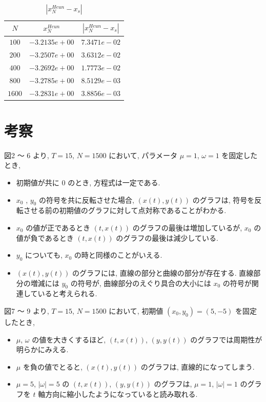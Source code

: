 \documentclass[11pt]{jsarticle}
\begin{document}
\begin{table}[htbp]
\centering
\begin{tabular}{|c||c|c|} \hline
\textbf{$N$} & \textbf{$x^{Heun}_{N}$} & \textbf{$|x^{Heun}_{N}-x_{s}|$} \\ \hline
$100$ & $-3.2135e+00$ & $7.3471e-02$ \\ \hline
$200$ & $-3.2507e+00$ & $3.6312e-02$ \\ \hline
$400$ & $-3.2692e+00$ & $1.7773e-02$ \\ \hline
$800$ & $-3.2785e+00$ & $8.5129e-03$ \\ \hline
$1600$ & $-3.2831e+00$ & $3.8856e-03$ \\ \hline
\end{tabular}
\caption{$|x^{Heun}_{N}-x_{s}|$}
\end{table}



\clearpage
\section{考察}
図2 〜 6 より, $T = 15$, $N = 1500$ において, パラメータ $\mu = 1$, $\omega = 1$ を固定したとき, 
\begin{itemize}
\item 初期値が共に $0$ のとき, 方程式は一定である. 
\item $x_{0}$ , $y_{0}$ の符号を共に反転させた場合, $(x(t), y(t))$ のグラフは, 符号を反転させる前の初期値のグラフに対して点対称であることがわかる. 
\item $x_{0}$ の値が正であるとき $(t, x(t))$ のグラフの最後は増加しているが, $x_{0}$ の値が負であるとき $(t, x(t))$ のグラフの最後は減少している. 
\item $y_{0}$ についても, $x_{0}$ の時と同様のことがいえる. 
\item $(x(t), y(t))$ のグラフには, 直線の部分と曲線の部分が存在する. 直線部分の増減には $y_{0}$ の符号が, 曲線部分のえぐり具合の大小には $x_{0}$ の符号が関連していると考えられる. 
\end{itemize}

図7 〜 9 より, $T = 15$, $N = 1500$ において, 初期値 $(x_{0}, y_{0}) = (5, -5)$ を固定したとき, 
\begin{itemize}
\item $\mu$, $\omega$ の値を大きくするほど, $(t, x(t))$, $(y, y(t))$ のグラフでは周期性が明らかにみえる. 
\item $\mu$ を負の値でとると, $(x(t), y(t))$ のグラフは, 直線的になってしまう. 
\item $\mu = 5$, $|\omega| = 5$ の $(t, x(t))$, $(y, y(t))$ のグラフは, $\mu = 1$, $|\omega| = 1$ のグラフを $t$ 軸方向に縮小したようになっていると読み取れる. 
\end{itemize}
\end{document}

